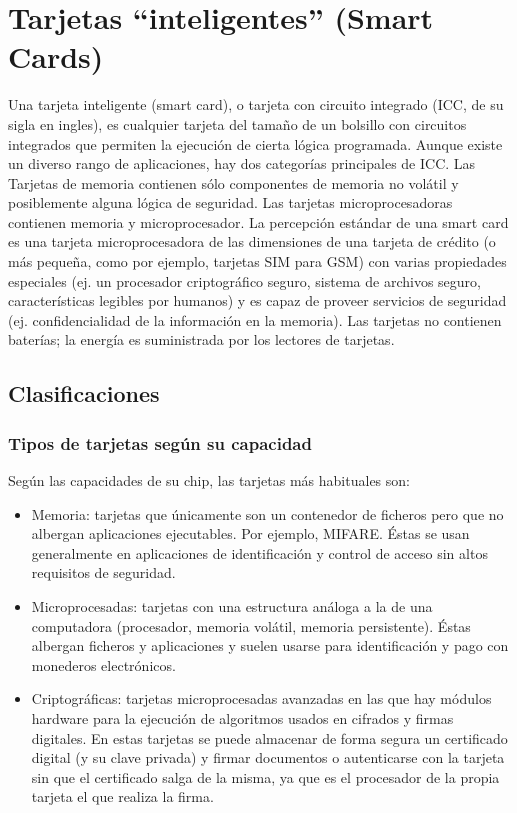 \chapter{Tarjetas “inteligentes” (Smart Cards)}

Una tarjeta inteligente (smart card), o tarjeta con circuito integrado (ICC, de su sigla en ingles), es cualquier tarjeta del tamaño de un bolsillo con circuitos integrados que permiten la ejecución de cierta lógica programada. 
Aunque existe un diverso rango de aplicaciones, hay dos categorías principales de ICC. Las Tarjetas de memoria contienen sólo componentes de memoria no volátil y posiblemente alguna lógica de seguridad. Las tarjetas microprocesadoras contienen memoria y microprocesador.
La percepción estándar de una smart card es una tarjeta microprocesadora de las dimensiones de una tarjeta de crédito (o más pequeña, como por ejemplo, tarjetas SIM para GSM) con varias propiedades especiales (ej. un procesador criptográfico seguro, sistema de archivos seguro, características legibles por humanos) y es capaz de proveer servicios de seguridad (ej.     confidencialidad de la información en la memoria).
Las tarjetas no contienen baterías; la energía es suministrada por los lectores de tarjetas.

\section{Clasificaciones}

\subsection{Tipos de tarjetas según su capacidad}

\bigskip
Según las capacidades de su chip, las tarjetas más habituales son:

\begin{itemize}
\item Memoria: tarjetas que únicamente son un contenedor de ficheros pero que no albergan aplicaciones ejecutables. Por ejemplo, MIFARE. Éstas se usan generalmente en aplicaciones de identificación y control de acceso sin altos requisitos de seguridad. 
\item Microprocesadas: tarjetas con una estructura análoga a la de una computadora (procesador, memoria volátil, memoria persistente). Éstas albergan ficheros y aplicaciones y suelen usarse para identificación y pago con monederos electrónicos. 
\item Criptográficas: tarjetas microprocesadas avanzadas en las que hay módulos hardware para la ejecución de algoritmos usados en cifrados y firmas digitales. En estas tarjetas se puede almacenar de forma segura un certificado digital (y su clave privada) y firmar documentos o autenticarse con la tarjeta sin que el certificado salga de la misma, ya que es el procesador de la propia tarjeta el que realiza la firma.
\end{itemize}



